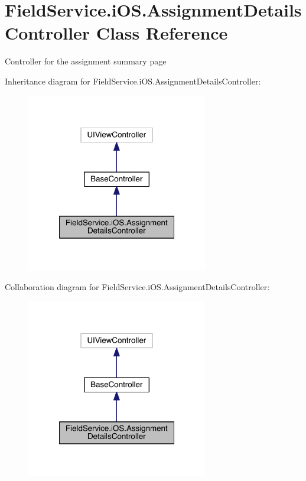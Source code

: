 \hypertarget{class_field_service_1_1i_o_s_1_1_assignment_details_controller}{\section{Field\+Service.\+i\+O\+S.\+Assignment\+Details\+Controller Class Reference}
\label{class_field_service_1_1i_o_s_1_1_assignment_details_controller}
}


Controller for the assignment summary page  




Inheritance diagram for Field\+Service.\+i\+O\+S.\+Assignment\+Details\+Controller\+:
\nopagebreak
\begin{figure}[H]
\begin{center}
\leavevmode
\includegraphics[width=224pt]{class_field_service_1_1i_o_s_1_1_assignment_details_controller__inherit__graph}
\end{center}
\end{figure}


Collaboration diagram for Field\+Service.\+i\+O\+S.\+Assignment\+Details\+Controller\+:
\nopagebreak
\begin{figure}[H]
\begin{center}
\leavevmode
\includegraphics[width=224pt]{class_field_service_1_1i_o_s_1_1_assignment_details_controller__coll__graph}
\end{center}
\end{figure}
